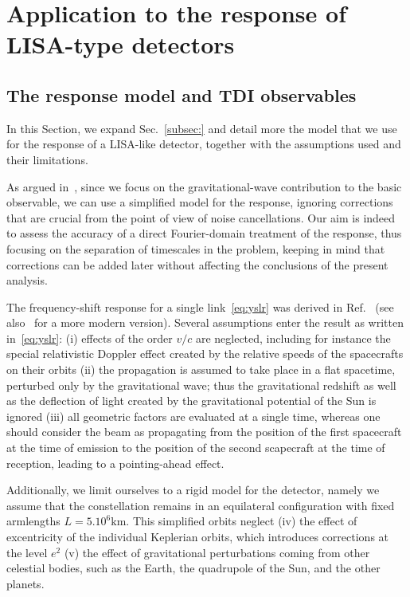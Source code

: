 \documentclass[aps,showpacs,%
prd,superscriptaddress,nofootinbib]{revtex4}
\begin{document}

\section{Application to the response of LISA-type detectors}
\label{sec:LISA}


\subsection{The response model and TDI observables}
\label{subsec:modelLISA}

In this Section, we expand Sec.~\ref{subsec:} and detail more the model that we use for the response of a LISA-like detector, together with the assumptions used and their limitations.

As argued in~\cite{Krolak+04}, since we focus on the gravitational-wave contribution to the basic observable, we can use a simplified model for the response, ignoring corrections that are crucial from the point of view of noise cancellations. Our aim is indeed to assess the accuracy of a direct Fourier-domain treatment of the response, thus focusing on the separation of timescales in the problem, keeping in mind that corrections can be added later without affecting the conclusions of the present analysis.

The frequency-shift response for a single link~\eqref{eq:yslr} was derived in Ref.~\cite{EW75} (see also~\cite{} for a more modern version). Several assumptions enter the result as written in~\eqref{eq:yslr}: (i) effects of the order $v/c$ are neglected, including for instance the special relativistic Doppler effect created by the relative speeds of the spacecrafts on their orbits (ii) the propagation is assumed to take place in a flat spacetime, perturbed only by the gravitational wave; thus the gravitational redshift as well as the deflection of light created by the gravitational potential of the Sun is ignored (iii) all geometric factors are evaluated at a single time, whereas one should consider the beam as propagating from the position of the first spacecraft at the time of emission to the position of the second scapecraft at the time of reception, leading to a pointing-ahead effect.

Additionally, we limit ourselves to a rigid model for the detector, namely we assume that the constellation remains in an equilateral configuration with fixed armlengths $L=5.10^{6}\mathrm{km}$. This simplified orbits neglect (iv) the effect of excentricity of the individual Keplerian orbits, which introduces corrections at the level $e^{2}$ (v) the effect of gravitational perturbations coming from other celestial bodies, such as the Earth, the quadrupole of the Sun, and the other planets. 
\end{document}
